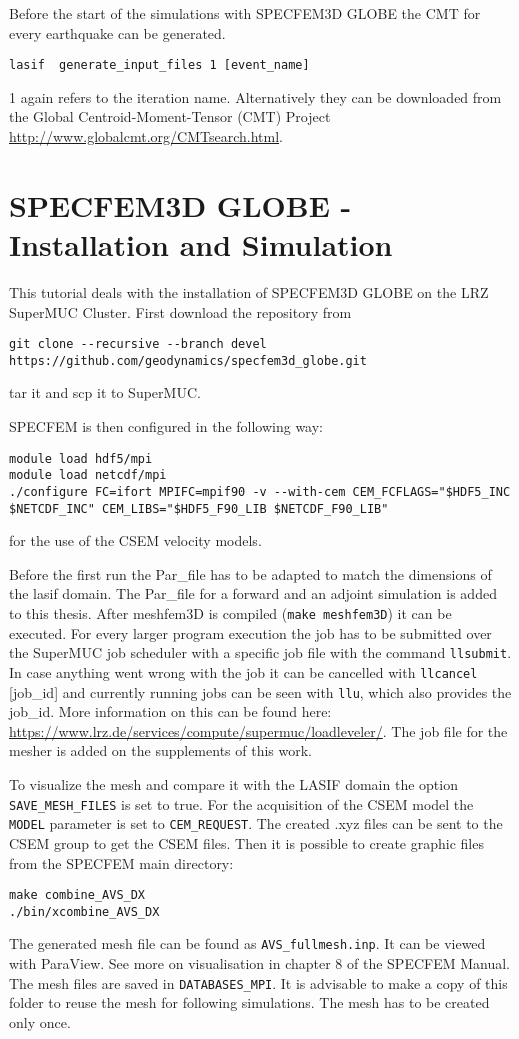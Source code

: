 Before the start of the simulations with SPECFEM3D GLOBE the CMT for every earthquake can be generated.
\begin{lstlisting} 
lasif  generate_input_files 1 [event_name]
\end{lstlisting}
1 again refers to the iteration name. 
Alternatively they can be downloaded from the Global Centroid-Moment-Tensor (CMT) Project
\url{http://www.globalcmt.org/CMTsearch.html}.


\section{SPECFEM3D GLOBE - Installation and Simulation}

This tutorial deals with the installation of SPECFEM3D GLOBE on the 
LRZ SuperMUC Cluster. 
First download the repository from
\begin{lstlisting} 
git clone --recursive --branch devel https://github.com/geodynamics/specfem3d_globe.git
\end{lstlisting}
tar it and scp it to SuperMUC.

SPECFEM is then configured in the following way:
\begin{lstlisting} 
module load hdf5/mpi
module load netcdf/mpi
./configure FC=ifort MPIFC=mpif90 -v --with-cem CEM_FCFLAGS="$HDF5_INC  $NETCDF_INC" CEM_LIBS="$HDF5_F90_LIB $NETCDF_F90_LIB"
\end{lstlisting}
for the use of the CSEM velocity models.

Before the first run the Par\_file has to be adapted  to match the 
dimensions of the lasif domain. 
The Par\_file for a forward and an adjoint simulation is added to this thesis.
After meshfem3D is compiled (\texttt{make meshfem3D}) it can be executed. 
For every larger program execution the job has to be submitted over the SuperMUC
job scheduler with a specific job file with the command \texttt{llsubmit}.
In case anything went wrong with the job it can be cancelled with 
\texttt{llcancel} [job\_id] and currently running jobs can be seen with \texttt{llu}, which also provides the job\_id.
More information on this can be found here: \url{https://www.lrz.de/services/compute/supermuc/loadleveler/}.
The job file for the mesher is added on the supplements of this work.

To visualize the mesh and compare it with the LASIF domain the option 
\texttt{SAVE\_MESH\_FILES} is set to true. 
For the acquisition of the CSEM model the \texttt{MODEL} parameter is set
to \texttt{CEM\_REQUEST}. 
The created .xyz files can be sent to the CSEM group to get the CSEM files.
Then it is possible to create graphic files from the SPECFEM main directory:
\begin{lstlisting} 
make combine_AVS_DX
./bin/xcombine_AVS_DX
\end{lstlisting}
The generated mesh file can be found as \texttt{AVS\_fullmesh.inp}.
It can be viewed with ParaView.
See more on visualisation in chapter 8 of the SPECFEM Manual.
The mesh files are saved in \texttt{DATABASES\_MPI}. 
It is advisable to make a copy of this folder to reuse the mesh
for following simulations. 
The mesh has to be created only once.

